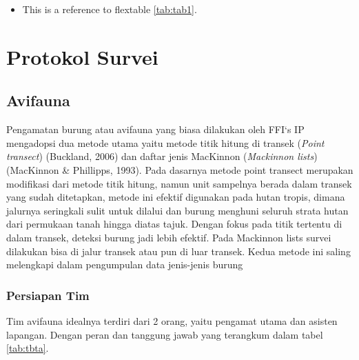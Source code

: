 \documentclass[
]{book}
\providecommand{\tightlist}{%
  \setlength{\itemsep}{0pt}\setlength{\parskip}{0pt}}
\begin{document}
\begin{itemize}
\tightlist
\item
  This is a reference to flextable \ref{tab:tab1}.
\end{itemize}

\hypertarget{protokol-survei}{%
\chapter*{Protokol Survei}\label{protokol-survei}}

\hypertarget{avifauna}{%
\section*{Avifauna}\label{avifauna}}

Pengamatan burung atau avifauna yang biasa dilakukan oleh FFI`s IP mengadopsi dua metode utama yaitu metode titik hitung di transek (\emph{Point transect}) (Buckland, 2006) dan daftar jenis MacKinnon (\emph{Mackinnon lists}) (MacKinnon \& Phillipps, 1993). Pada dasarnya metode point transect merupakan modifikasi dari metode titik hitung, namun unit sampelnya berada dalam transek yang sudah ditetapkan, metode ini efektif digunakan pada hutan tropis, dimana jalurnya seringkali sulit untuk dilalui dan burung menghuni seluruh strata hutan dari permukaan tanah hingga diatas tajuk. Dengan fokus pada titik tertentu di dalam transek, deteksi burung jadi lebih efektif. Pada Mackinnon lists survei dilakukan bisa di jalur transek atau pun di luar transek. Kedua metode ini saling melengkapi dalam pengumpulan data jenis-jenis burung

\hypertarget{persiapan-tim}{%
\subsection*{Persiapan Tim}\label{persiapan-tim}}

Tim avifauna idealnya terdiri dari 2 orang, yaitu pengamat utama dan asisten lapangan. Dengan peran dan tanggung jawab yang terangkum dalam tabel \ref{tab:tbta}.
\end{document}
